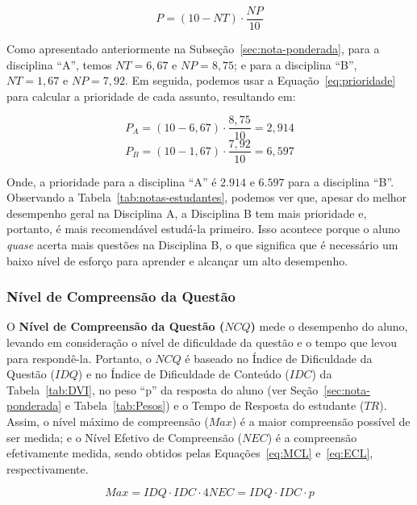 \begin{equation}
    \label{eq:prioridade}
    P = (10 - NT)\cdot \frac{NP}{10}
\end{equation}

Como apresentado anteriormente na Subseção~\ref{sec:nota-ponderada}, para a disciplina ``A'', temos $NT = 6,67 $ e $NP = 8,75$; e para a disciplina ``B'', $NT = 1,67 $ e $NP = 7,92$. Em seguida, podemos usar a Equação~\ref{eq:prioridade} para calcular a prioridade de cada assunto, resultando em:

$$ P_A = (10 - 6,67) \cdot \frac{8,75}{10} = 2,914$$
$$ P_B = (10 - 1,67) \cdot \frac{7,92}{10} = 6,597$$

Onde, a prioridade para a disciplina ``A'' é $2.914 $ e $6.597$ para a disciplina ``B''. Observando a Tabela~\ref{tab:notas-estudantes}, podemos ver que, apesar do melhor desempenho geral na Disciplina A, a Disciplina B tem mais prioridade e, portanto, é mais recomendável estudá-la primeiro. Isso acontece porque o aluno \textit{quase} acerta mais questões na Disciplina B, o que significa que é necessário um baixo nível de esforço para aprender e alcançar um alto desempenho.


\subsubsection{Nível de Compreensão da Questão}\label{sec:compreensao-questao}

O \textbf{Nível de Compreensão da Questão ($NCQ$)} mede o desempenho do aluno, levando em consideração o nível de dificuldade da questão e o tempo que levou para respondê-la. Portanto, o $NCQ$ é baseado no Índice de Dificuldade da Questão ($IDQ$) e no Índice de Dificuldade de Conteúdo ($IDC$) da Tabela~\ref{tab:DVI}, no peso ``p'' da resposta do aluno (ver Seção~\ref{sec:nota-ponderada} e Tabela~\ref{tab:Pesos}) e o Tempo de Resposta do estudante ($TR$). Assim, o nível máximo de compreensão ($Max$) é a maior compreensão possível de ser medida; e o Nível Efetivo de Compreensão ($NEC$) é a compreensão efetivamente medida, sendo obtidos pelas Equações~\ref{eq:MCL} e~\ref{eq:ECL}, respectivamente.

\begin{subequations}
\label{eq:MaxNEC}
\begin{equation}\label{eq:MCL}
Max = IDQ\cdot IDC \cdot 4
\end{equation}
\begin{equation}\label{eq:ECL}
NEC = IDQ \cdot IDC \cdot p
\end{equation}
\end{subequations}

